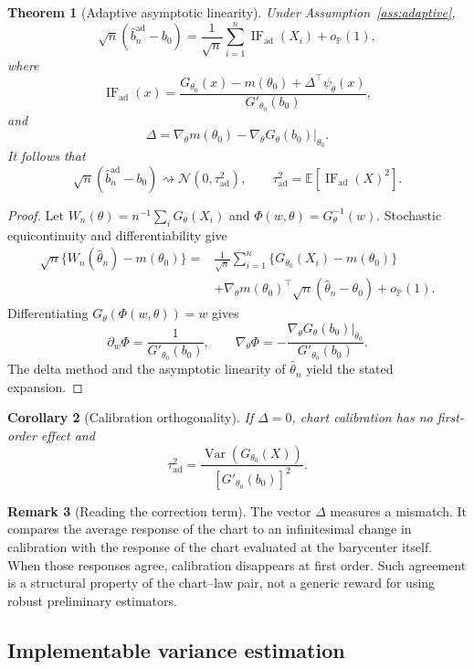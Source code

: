 \documentclass[11pt,a4paper]{article}
\newtheorem{theorem}{Theorem}[section]
\newtheorem{corollary}[theorem]{Corollary}
\theoremstyle{definition}
\newtheorem{remark}[theorem]{Remark}
\newcommand{\E}{\mathbb{E}}
\newcommand{\Prob}{\mathbb{P}}
\newcommand{\Var}{\operatorname{Var}}
\newcommand{\IF}{\operatorname{IF}}
\begin{document}
\begin{theorem}[Adaptive asymptotic linearity]\label{thm:adaptive-al}
Under Assumption~\ref{ass:adaptive},
\[
\sqrt n(\widehat b_n^{\mathrm{ad}}-b_0)
=
\frac1{\sqrt n}\sum_{i=1}^n\IF_{\mathrm{ad}}(X_i)+o_{\Prob}(1),
\]
where
\[
\IF_{\mathrm{ad}}(x)
=
\frac{
G_{\theta_0}(x)-m(\theta_0)
+
\Delta^\top\psi_\theta(x)
}
{G'_{\theta_0}(b_0)},
\]
and
\[
\Delta
=
\nabla_\theta m(\theta_0)
-
\nabla_\theta G_\theta(b_0)\big|_{\theta_0}.
\]
It follows that
\[
\sqrt n(\widehat b_n^{\mathrm{ad}}-b_0)
\rightsquigarrow
\mathcal N(0,\tau_{\mathrm{ad}}^2),
\qquad
\tau_{\mathrm{ad}}^2=\E[\IF_{\mathrm{ad}}(X)^2].
\]
\end{theorem}

\begin{proof}
Let $W_n(\theta)=n^{-1}\sum_iG_\theta(X_i)$ and $\Phi(w,\theta)=G_\theta^{-1}(w)$. Stochastic equicontinuity and differentiability give
\[
\begin{aligned}
\sqrt n\{W_n(\widehat\theta_n)-m(\theta_0)\}
={}&
\frac1{\sqrt n}\sum_{i=1}^n
\{G_{\theta_0}(X_i)-m(\theta_0)\}\\
&+\nabla_\theta m(\theta_0)^\top
\sqrt n(\widehat\theta_n-\theta_0)
+o_{\Prob}(1).
\end{aligned}
\]
Differentiating $G_\theta(\Phi(w,\theta))=w$ gives
\[
\partial_w\Phi=\frac1{G'_{\theta_0}(b_0)},
\qquad
\nabla_\theta\Phi
=-\frac{\nabla_\theta G_\theta(b_0)|_{\theta_0}}{G'_{\theta_0}(b_0)}.
\]
The delta method and the asymptotic linearity of $\widehat\theta_n$ yield the stated expansion.
\end{proof}

\begin{corollary}[Calibration orthogonality]\label{cor:orthogonality}
If $\Delta=0$, chart calibration has no first-order effect and
\[
\tau_{\mathrm{ad}}^2
=
\frac{\Var(G_{\theta_0}(X))}{[G'_{\theta_0}(b_0)]^2}.
\]
\end{corollary}

\begin{remark}[Reading the correction term]
The vector $\Delta$ measures a mismatch. It compares the average response of the chart to an infinitesimal change in calibration with the response of the chart evaluated at the barycenter itself. When those responses agree, calibration disappears at first order. Such agreement is a structural property of the chart--law pair, not a generic reward for using robust preliminary estimators.
\end{remark}

\subsection{Implementable variance estimation}
\end{document}
